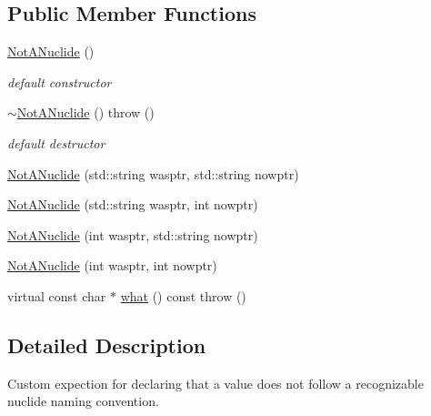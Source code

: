 \subsection*{Public Member Functions}
\begin{DoxyCompactItemize}
\item 
\mbox{\label{classpyne_1_1nucname_1_1_not_a_nuclide_ac1c10c25703f622788f475609fd5eed6}} 
\hyperlink{classpyne_1_1nucname_1_1_not_a_nuclide_ac1c10c25703f622788f475609fd5eed6}{Not\+A\+Nuclide} ()
\begin{DoxyCompactList}\small\item\em default constructor \end{DoxyCompactList}\item 
\mbox{\label{classpyne_1_1nucname_1_1_not_a_nuclide_a2fd948fc4d3be06a456b30188944b88a}} 
\hyperlink{classpyne_1_1nucname_1_1_not_a_nuclide_a2fd948fc4d3be06a456b30188944b88a}{$\sim$\+Not\+A\+Nuclide} ()  throw ()
\begin{DoxyCompactList}\small\item\em default destructor \end{DoxyCompactList}\item 
\hyperlink{classpyne_1_1nucname_1_1_not_a_nuclide_a32741575cb99d294d54f39bc4ca5e51c}{Not\+A\+Nuclide} (std\+::string wasptr, std\+::string nowptr)
\item 
\hyperlink{classpyne_1_1nucname_1_1_not_a_nuclide_a10f9f9c4be5b439f1dafd1450943252d}{Not\+A\+Nuclide} (std\+::string wasptr, int nowptr)
\item 
\hyperlink{classpyne_1_1nucname_1_1_not_a_nuclide_af8665194481f65e932cbd4244ee636ae}{Not\+A\+Nuclide} (int wasptr, std\+::string nowptr)
\item 
\hyperlink{classpyne_1_1nucname_1_1_not_a_nuclide_adbc9b62fa21ec1ab4957ca8a4569a8c6}{Not\+A\+Nuclide} (int wasptr, int nowptr)
\item 
virtual const char $\ast$ \hyperlink{classpyne_1_1nucname_1_1_not_a_nuclide_a989e97e1915b17eabeacb12a5dc210aa}{what} () const  throw ()
\end{DoxyCompactItemize}


\subsection{Detailed Description}
Custom expection for declaring that a value does not follow a recognizable nuclide naming convention. 


